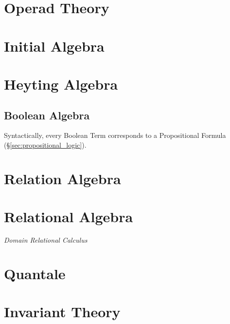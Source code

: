 \section{Operad Theory}\label{sec:operad_theory}

\section{Initial Algebra}\label{sec:initial_algebra}

\section{Heyting Algebra}\label{sec:heyting_algebra}

\subsection{Boolean Algebra}\label{sec:boolean_algebra}

Syntactically, every Boolean Term corresponds to a Propositional
Formula (\S\ref{sec:propositional_logic}).



\section{Relation Algebra}

\section{Relational Algebra}

\emph{Domain Relational Calculus}



\section{Quantale}

\section{Invariant Theory}\label{sec:invariant_theory}
